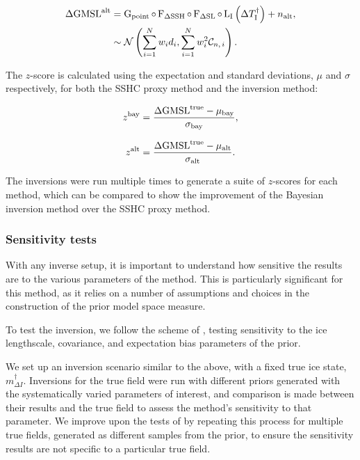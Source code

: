\begin{align}
 \Delta \mathrm{GMSL}^{\mathrm{alt}} &= \operatorname{{G}}_{{\text{point}}} \circ \operatorname{{F}}_{{\Delta \mathrm{SSH}}} \circ \operatorname{{F}}_{{\Delta \mathrm{SL}}} \circ \operatorname{{L}}_{{\text{I}}} \left(\Delta T_\text{I}^\dagger\right) + n_{\text{alt}}, \\
 &\sim \mathcal{N}\left( \sum_{i=1}^{N} w_i d_i, \sum_{i=1}^{N} w_i^2 \mathcal{C}_{n,\,i} \right). \label{eq:alt-gmsl-model}
\end{align}

The $z$-score is calculated using the expectation and standard deviations, $\mu$ and $\sigma$ respectively, for both the SSHC proxy method and the inversion method:

\begin{align}
    z^{\text{bay}} &= \frac{\Delta \mathrm{GMSL}^{\mathrm{true}} - \mu_{\text{bay}}}{\sigma_{\text{bay}}}, \\[7pt]
    z^{\text{alt}} &= \frac{\Delta \mathrm{GMSL}^{\mathrm{true}} - \mu_{\text{alt}}}{\sigma_{\text{alt}}}.
\end{align}

The inversions were run multiple times to generate a suite of $z$-scores for each method, which can be compared to show the improvement of the Bayesian inversion method over the SSHC proxy method.

\subsubsection{Sensitivity tests}

With any inverse setup, it is important to understand how sensitive the results are to the various parameters of the method. This is particularly significant for this method, as it relies on a number of assumptions and choices in the construction of the prior model space measure.

To test the inversion, we follow the scheme of \textcite{heathcoteScaleableBayesianFramework2026}, testing sensitivity to the ice lengthscale, covariance, and expectation bias parameters of the prior.

We set up an inversion scenario similar to the above, with a fixed true ice state, $m_{\Delta I}^\dagger$. Inversions for the true field were run with different priors generated with the systematically varied parameters of interest, and comparison is made between their results and the true field to assess the method's sensitivity to that parameter. We improve upon the tests of \textcite{heathcoteScaleableBayesianFramework2026} by repeating this process for multiple true fields, generated as different samples from the prior, to ensure the sensitivity results are not specific to a particular true field.

